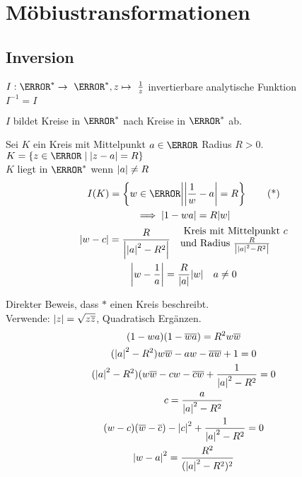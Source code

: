 \section{Möbiustransformationen}
\subsection{Inversion}
$I : \C^* \rightarrow \C^* , z \mapsto \frac{1}{z}$ invertierbare analytische Funktion \\
$I^{-1} = I$ \\
\begin{beh}
	$I$ bildet Kreise in $\C^*$ nach Kreise in $\C^*$ ab. \\
	\begin{bew}
		Sei $K$ ein Kreis mit Mittelpunkt $a \in \C$ Radius $R > 0$. $K = \{ z \in \C \mid \abs{z-a} = R \}$ \\
		$K$ liegt in $\C^*$ wenn $\abs{a} \neq R$
		\begin{gather*}
			I(K) = \left\{ w \in \C \middle| \abs{\frac{1}{w} - a} = R \right\} \tag{*} \\
			\implies \abs{1-wa} = R \abs{w} \\
			\abs{w-c} = \frac{R}{\abs{\abs{a}^2-R^2}} \quad \begin{matrix*}[l] \text{ Kreis mit Mittelpunkt $c$} \\ \text{und Radius } \frac{R}{\abs{\abs{a}^2-R^2}} \end{matrix*} \\
			\abs{w - \frac{1}{a}} = \frac{R}{\abs{a}} \abs{w} \quad a \neq 0
		\end{gather*}
		\begin{bew}
			Direkter Beweis, dass $*$ einen Kreis beschreibt. \\
			Verwende: $\abs{z} = \sqrt{z\overline{z}}$, Quadratisch Ergänzen. \\
			\begin{gather*}
				(1-wa)(1-\overline{w}\overline{a}) = R^2 w \overline{w} \\
				(\abs{a}^2 - R^2) w \overline{w} - aw - \overline{a}\overline{w} + 1 = 0 \\
				(\abs{a}^2 - R^2)( w \overline{w} - cw - \overline{c}\overline{w} + \frac{1}{\abs{a}^2 - R^2} = 0 \\
				\qquad c = \frac{a}{\abs{a}^2 - R^2} \\
				(w-c)(\overline{w}-\overline{c}) - \abs{c}^2 + \frac{1}{\abs{a}^2 - R^2} = 0 \\
				\abs{w-a}^2 = \frac{R^2}{(\abs{a}^2 - R^2)^2}
			\end{gather*}
		\end{bew}
	\end{bew}
\end{beh}

